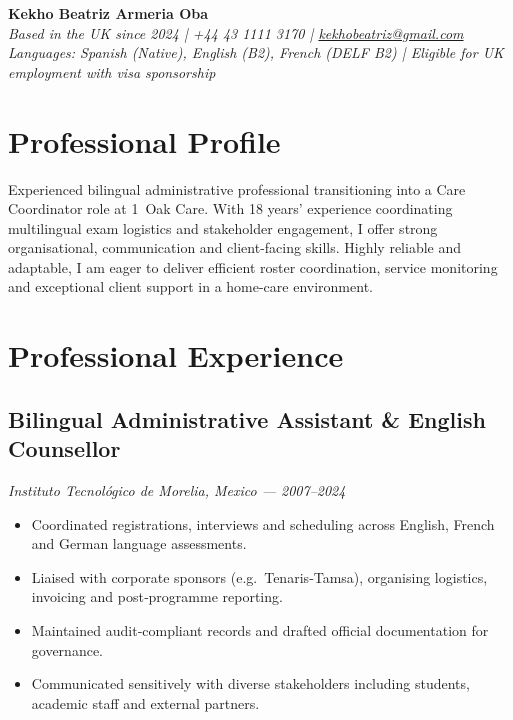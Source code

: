 \documentclass[11pt,a4paper]{article}
\begin{document}
	\begin{center}
		{\LARGE \textbf{Kekho Beatriz Armeria Oba}}\\[1mm]
		\textit{Based in the UK since 2024 \quad | \quad +44 43 1111 3170 \quad | \quad \href{mailto:kekhobeatriz@gmail.com}{kekhobeatriz@gmail.com}}\\
		\textit{Languages: Spanish (Native), English (B2), French (DELF B2) \quad | \quad Eligible for UK employment with visa sponsorship}
	\end{center}
	
	\vspace{1em}
	
	\section*{Professional Profile}
	Experienced bilingual administrative professional transitioning into a Care Coordinator role at 1 Oak Care. With 18 years’ experience coordinating multilingual exam logistics and stakeholder engagement, I offer strong organisational, communication and client-facing skills. Highly reliable and adaptable, I am eager to deliver efficient roster coordination, service monitoring and exceptional client support in a home-care environment.
	
	\section*{Professional Experience}
	
	\subsection*{Bilingual Administrative Assistant \& English Counsellor}
	\textit{Instituto Tecnol\'ogico de Morelia, Mexico --- 2007--2024}
	\begin{itemize}[leftmargin=*]
		\item Coordinated registrations, interviews and scheduling across English, French and German language assessments.
		\item Liaised with corporate sponsors (e.g.\ Tenaris‑Tamsa), organising logistics, invoicing and post‑programme reporting.
		\item Maintained audit‑compliant records and drafted official documentation for governance.
		\item Communicated sensitively with diverse stakeholders including students, academic staff and external partners.
	\end{itemize}
	
\end{document}

